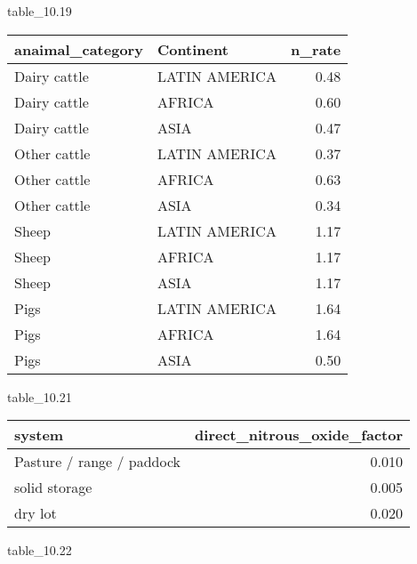 \documentclass[
]{article}
\newenvironment{Shaded}{\begin{snugshade}}{\end{snugshade}}
\newcommand{\FloatTok}[1]{\textcolor[rgb]{0.00,0.00,0.81}{#1}}
\newcommand{\FunctionTok}[1]{\textcolor[rgb]{0.00,0.00,0.00}{#1}}
\newcommand{\NormalTok}[1]{#1}
\newcommand{\SpecialCharTok}[1]{\textcolor[rgb]{0.00,0.00,0.00}{#1}}
\begin{document}
table\_10.19

\begin{Shaded}
\end{Shaded}

\begin{longtable}[]{@{}llr@{}}
\toprule()
anaimal\_category & Continent & n\_rate \\
\midrule()
\endhead
Dairy cattle & LATIN AMERICA & 0.48 \\
Dairy cattle & AFRICA & 0.60 \\
Dairy cattle & ASIA & 0.47 \\
Other cattle & LATIN AMERICA & 0.37 \\
Other cattle & AFRICA & 0.63 \\
Other cattle & ASIA & 0.34 \\
Sheep & LATIN AMERICA & 1.17 \\
Sheep & AFRICA & 1.17 \\
Sheep & ASIA & 1.17 \\
Pigs & LATIN AMERICA & 1.64 \\
Pigs & AFRICA & 1.64 \\
Pigs & ASIA & 0.50 \\
\bottomrule()
\end{longtable}

table\_10.21

\begin{Shaded}
\end{Shaded}

\begin{longtable}[]{@{}lr@{}}
\toprule()
system & direct\_nitrous\_oxide\_factor \\
\midrule()
\endhead
Pasture / range / paddock & 0.010 \\
solid storage & 0.005 \\
dry lot & 0.020 \\
\bottomrule()
\end{longtable}

table\_10.22

\begin{Shaded}
\end{Shaded}
\end{document}
